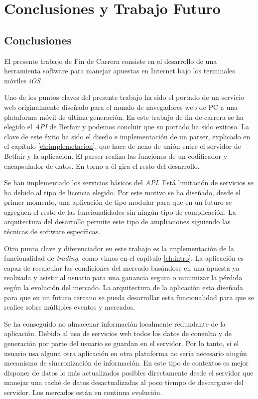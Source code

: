 \chapter{Conclusiones y Trabajo Futuro}
\label{ch:conclusiones}

\section{Conclusiones}
 El presente trabajo de Fin de Carrera consiste en el desarrollo de una herramienta software para manejar apuestas en Internet bajo los terminales móviles \emph{iOS}. 
 
Uno de los puntos claves del presente trabajo ha sido el portado de un servicio web originalmente diseñado para el mundo de navegadores web de PC a una plataforma móvil de última generación. En este trabajo de fin de carrera se ha elegido el \emph{API} de Betfair y podemos concluir que su portado ha sido exitoso. La clave de este éxito ha sido el diseño e implementación de un parser, explicado en el capítulo \ref{ch:implemetacion}, que hace de nexo de unión entre el servidor de Betfair y la aplicación. El parser realiza las funciones de un codificador y encapsulador de datos. En torno a él gira el resto del desarrollo.
 
 Se han implementado los servicios básicos del \emph{API}. Está limitación de servicios se ha debido al tipo de licencia elegido. Por este motivo se ha diseñado, desde el primer momento, una aplicación de tipo modular para que en un futuro se agreguen el resto de las funcionalidades sin ningún tipo de complicación. La arquitectura del desarrollo permite este tipo de ampliaciones siguiendo las técnicas de software específicas.
 
 Otro punto clave y diferenciador en este trabajo es la implementación de la funcionalidad de \emph{trading}, como vimos en el capítulo \ref{ch:intro}. La aplicación es capaz de recalcular las condiciones del mercado basándose en una apuesta ya realizada y asistir al usuario para una ganancia segura o minimizar la pérdida según la evolución del mercado. La arquitectura de la aplicación esta diseñada para que en un futuro cercano se pueda desarrollar esta funcionalidad para que se realice sobre múltiples eventos y mercados.
 
 Se ha conseguido no almacenar información localmente redundante de la aplicación. Debido al uso de servicios web todos los datos de consulta y de generación por parte del usuario se guardan en el servidor. Por lo tanto, si el usuario usa alguna otra aplicación en otra plataforma no sería necesario ningún mecanismo de sincronización de información. En este tipo de contextos es mejor disponer de datos lo más actualizados posibles directamente desde el servidor que manejar una caché de datos desactualizadas al poco tiempo de descargarse del servidor. Los mercados están en continua evolución.
 

